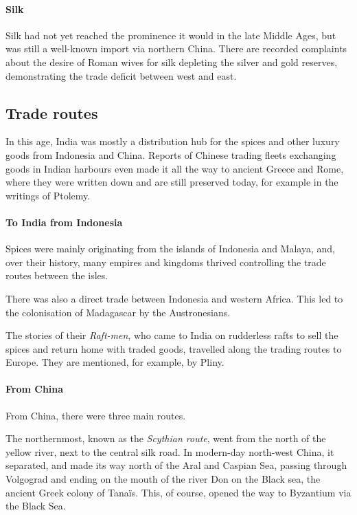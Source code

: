 \documentclass[11pt, a4paper, headings=standardclasses]{scrartcl}
\begin{document}
\paragraph{Silk}
Silk had not yet reached the prominence it would in the late Middle Ages, but was still a well-known import via northern China. There are recorded complaints about the desire of Roman wives for silk depleting the silver and gold reserves, demonstrating the trade deficit between west and east.\autocite[Chapter 13]{Rome}
\subsection{Trade routes}
In this age, India was mostly a distribution hub for the spices and other luxury goods from Indonesia and China. Reports of Chinese trading fleets exchanging goods in Indian harbours even made it all the way to ancient Greece and Rome, where they were written down and are still preserved today, for example in the writings of Ptolemy.\autocite[p.~148-150]{Rome}

\paragraph{To India from Indonesia}

Spices were mainly originating from the islands of Indonesia and Malaya, and, over their history, many empires and kingdoms thrived controlling the trade routes between the isles.\autocite{Indonesia}

There was also a direct trade between Indonesia and western Africa. This led to the colonisation of Madagascar by the Austronesians.\autocite{Madagascar}

The stories of their \emph{Raft-men}, who came to India on rudderless rafts to sell the spices and return home with traded goods, travelled along the trading routes to Europe. They are mentioned, for example, by Pliny.\autocite[Chapter 8]{Rome}

\paragraph{From China}

From China, there were three main routes.

The northernmost, known as the \emph{Scythian route}, went from the north of the yellow river, next to the central silk road. In modern-day north-west China, it separated, and made its way north of the Aral and Caspian Sea, passing through Volgograd and ending on the mouth of the river Don on the Black sea, the ancient Greek colony of Tana\"{i}s. This, of course, opened the way to Byzantium via the Black Sea.\autocite[149]{Rome}
\end{document}
